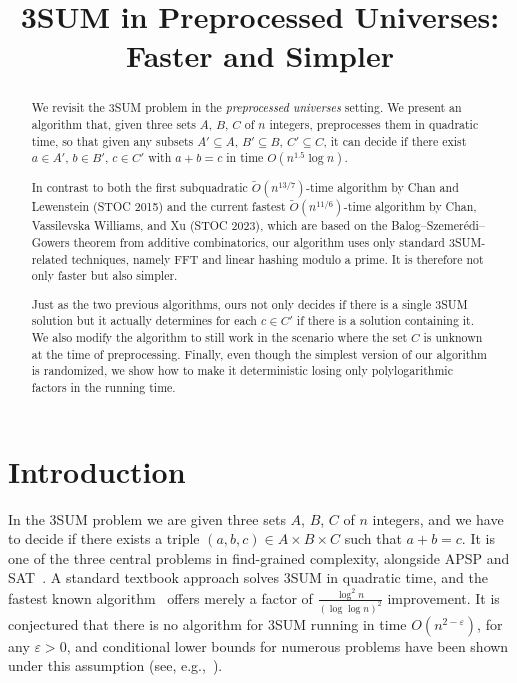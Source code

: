 \documentclass{theoretics}
\title{3SUM in Preprocessed Universes: Faster and Simpler}
\newcommand{\Ot}{\widetilde{O}}
\begin{document}
\maketitle

\begin{abstract}
We revisit the 3SUM problem in the \emph{preprocessed universes} setting. We present an algorithm that, given three sets $A$, $B$, $C$ of $n$ integers, preprocesses them in quadratic time, so that given any subsets $A' \subseteq A$, $B' \subseteq B$, $C' \subseteq C$, it can decide if there exist $a \in A'$, $b \in B'$, $c \in C'$ with $a+b=c$ in time $O(n^{1.5} \log n)$.

In contrast to both the first subquadratic $\Ot(n^{13/7})$-time algorithm by Chan and Lewenstein (STOC 2015) and the current fastest $\Ot(n^{11/6})$-time algorithm by Chan, Vassilevska Williams, and Xu (STOC 2023), which are based on the Balog--Szemer\'edi--Gowers theorem from additive combinatorics, our algorithm uses only standard 3SUM-related techniques, namely FFT and linear hashing modulo a prime. It is therefore not only faster but also simpler.

Just as the two previous algorithms, ours not only decides if there is a single 3SUM solution but it actually determines for each $c \in C'$ if there is a solution containing it. We also modify the algorithm to still work in the scenario where the set $C$ is unknown at the time of preprocessing. Finally, even though the simplest version of our algorithm is randomized, we show how to make it deterministic losing only polylogarithmic factors in the running time.
\end{abstract}
 
\section{Introduction}

In the 3SUM problem we are given three sets $A$, $B$, $C$ of $n$ integers, and we have to decide if there exists a triple $(a, b, c) \in A \times B \times C$ such that $a+b = c$. It is one of the three central problems in find-grained complexity, alongside APSP and SAT~\cite{VassilevskaWilliams18}. A standard textbook approach solves 3SUM in quadratic time, and the fastest known algorithm~\cite{BaranDP08} offers merely a factor of $\frac{\log^2 n}{(\log \log n)^2}$ improvement. It is conjectured that there is no algorithm for 3SUM running in time $O(n^{2-\varepsilon})$, for any $\varepsilon > 0$, and conditional lower bounds for numerous problems have been shown under this assumption (see, e.g.,~\cite{VassilevskaWilliams18,FischerK024}).
\end{document}
